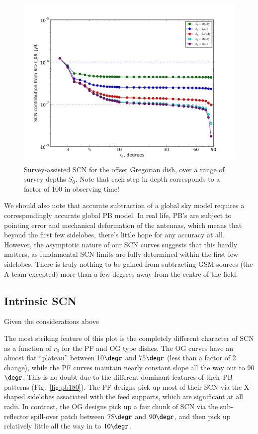 \documentclass{aa}
\begin{document}
\begin{figure}
\includegraphics[width=\columnwidth]{costcurve-survey-multiple}
\caption{\label{fig:cc-survey-multi}Survey-assisted SCN for the offset Gregorian dish, over a range of survey depths $S_0$. Note that each step in depth corresponds to a factor of 100 in observing time!}
\end{figure}

We should also note that accurate subtraction of a global sky model requires a correspondingly accurate global PB model. In real life, PB's are subject to pointing error and mechanical deformation of the antennas, which means that beyond the first few sidelobes, there's little hope for any accuracy at all. However, the asymptotic nature of our SCN curves suggests that this hardly matters, as fundamental SCN limits are fully determined within the first few sidelobes. There is truly nothing to be gained from subtracting GSM sources (the A-team excepted) more than a few degrees away from the centre of the field.

\subsection{Intrinsic SCN}

Given the considerations above

The most striking feature of this plot is the completely different character of SCN as a function of $r_0$ for the PF and OG type dishes. The OG curves have an almost flat ``plateau'' between 10$\degr$ and 75$\degr$ (less than a factor of 2 change), while the PF curves maintain nearly constant slope all the way out to 90$\degr$. This is no doubt due to the different dominant features of their PB patterns (Fig.~\ref{fig:pb180}). The PF designs pick up most of their SCN via the X-shaped sidelobes associated with the feed supports, which are significant at all radii. In contrast, the OG designs pick up a fair chunk of SCN via the sub-reflector spill-over patch between $75\degr$ and $90\degr$, and then pick up relatively little all the way in to $10\degr$. 
\end{document}
